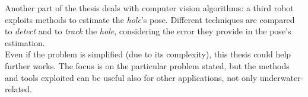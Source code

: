 \begin{abstracts}
Another part of the thesis deals with computer vision algorithms: a third robot exploits  methods to estimate the \textit{hole}'s pose. Different techniques are compared to \textit{detect} and to \textit{track} the \textit{hole}, considering the error they provide in the pose's estimation.\\
Even if the problem is simplified (due to its complexity), this thesis could help further works. The focus is on the particular problem stated, but the methods and tools exploited can be useful also for other applications, not only underwater-related. 

\end{abstracts}

\restoregeometry
